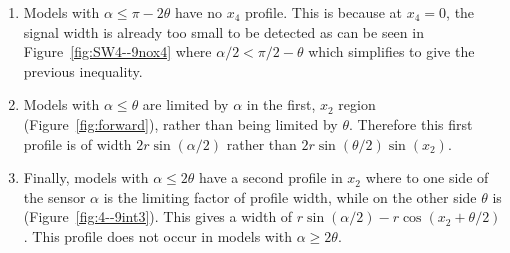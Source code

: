 \begin{enumerate}
\item Models with $\alpha \le \pi - 2\theta$  have no $x_4$ profile.
This is because at $x_4 = 0$, the signal width is already too small to be detected as can be seen in Figure~\ref{fig:SW4--9nox4} where $\alpha/2 < \pi/2 - \theta$ which simplifies to give the previous inequality.

\item Models with $\alpha \le \theta$ are limited by $\alpha$ in the first, $x_2$ region (Figure~\ref{fig:forward}), rather than being limited by $\theta$.
Therefore this first profile is of width $2r\sin(\alpha/2)$ rather than $2r\sin(\theta/2)\sin(x_2)$.

\item Finally, models with $\alpha \le 2\theta$ have a second profile in $x_2$ where to one side of the sensor $\alpha$ is the limiting factor of profile width, while on the other side $\theta$ is (Figure~\ref{fig:4--9int3}).
This gives a width of $r\sin(\alpha/2) - r\cos(x_2 + \theta/2)$.
This profile does not occur in models with $\alpha \ge 2\theta$.

\end{enumerate}

